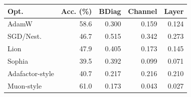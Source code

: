 \begin{tabular}{lrrrr}
\toprule
Opt. & Acc. (\%) & BDiag & Channel & Layer \\
\midrule
AdamW & 58.6 & 0.300 & 0.159 & 0.124 \\
SGD/Nest. & 46.7 & 0.515 & 0.342 & 0.273 \\
Lion & 47.9 & 0.405 & 0.173 & 0.145 \\
Sophia & 39.5 & 0.392 & 0.099 & 0.071 \\
Adafactor-style & 40.7 & 0.217 & 0.216 & 0.210 \\
Muon-style & 61.0 & 0.173 & 0.043 & 0.027 \\
\bottomrule
\end{tabular}
